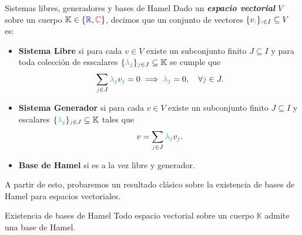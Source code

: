 \documentclass[titlepage,11pt,a4paper]{book}
\newcommand{\RR}{\ensuremath{\textcolor{blue}{\mathbb{R}}}}
\newcommand{\CC}{\ensuremath{\textcolor{Red}{\mathbb{C}}}}
\newcommand{\ii}{\ensuremath{\textcolor{TealBlue}{i}}}
\newcommand{\jj}{\ensuremath{\textcolor{OliveGreen}{j}}}
\newcommand{\KK}{\ensuremath{\mathbb{K}}}
\newcommand{\lamb}{\textcolor{TealBlue}{\lambda}}
\begin{document}
\begin{defn*}{Sistemas libres, generadores y bases de Hamel}
Dado un \textit{\textbf{espacio vectorial}} $V$ sobre un cuerpo $\mathbb{K} \in \{\RR,\CC\}$, decimos que un conjunto de vectores $\{v_{\ii}\}_{\ii \in I} \subseteq V$ es:
\begin{itemize}
    \item \textbf{Sistema Libre} si para cada $v \in V$ existe un subconjunto finito $J \subseteq I$ y para toda colección de esscalares $\{\lamb_{\jj}\}_{\jj \in J} \subseteq \KK$ se cumple que
    \[
        \sum_{\jj \in J} \lamb_{\jj} v_{\jj} = 0 \implies \lamb_{\jj} = 0, \quad \forall \jj \in J.
    \]
    \item \textbf{Sistema Generador} si para cada $v \in V$ existe un subconjunto finito $J \subseteq I$ y escalares $\{\lamb_{\jj}\}_{\jj \in J} \subseteq \KK$ tales que
    \[
        v = \sum_{\jj \in J} \lamb_{\jj} v_{\jj}.
    \]
    \item \textbf{Base de Hamel} si es a la vez libre y generador.
\end{itemize}

\end{defn*}

A partir de esto, probaremos un resultado clásico sobre la existencia de bases de Hamel para espacios vectoriales.

\begin{prop*}{Existencia de bases de Hamel}
Todo espacio vectorial sobre un cuerpo $\mathbb{K} $ admite una base de Hamel.
\end{prop*}
\end{document}
